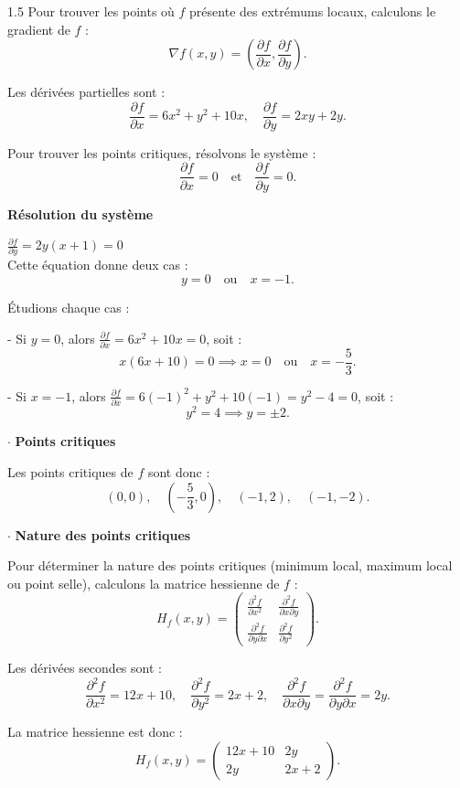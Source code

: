 \documentclass[12pt]{article}
\begin{document}
\begin{spacing}{1.5}
Pour trouver les points où $f$ présente des extrémums locaux, calculons le gradient de $f$ :
\[
\nabla f(x, y) = \left( \frac{\partial f}{\partial x}, \frac{\partial f}{\partial y} \right).
\]

Les dérivées partielles sont :
\[
\frac{\partial f}{\partial x} = 6x^2 + y^2 + 10x, \quad \frac{\partial f}{\partial y} = 2xy + 2y.
\]

Pour trouver les points critiques, résolvons le système :
\[
\frac{\partial f}{\partial x} = 0 \quad \text{et} \quad \frac{\partial f}{\partial y} = 0.
\]

\textbf{ Résolution du système}

 $\frac{\partial f}{\partial y} = 2y(x + 1) = 0$ \\
   Cette équation donne deux cas :
\[
   y = 0 \quad \text{ou} \quad x = -1.
\]

 Étudions chaque cas :

   - Si $y = 0$, alors $\frac{\partial f}{\partial x} = 6x^2 + 10x = 0$, soit :
\[
     x(6x + 10) = 0 \implies x = 0 \quad \text{ou} \quad x = -\frac{5}{3}.
\]

   - Si $x = -1$, alors $\frac{\partial f}{\partial x} = 6(-1)^2 + y^2 + 10(-1) = y^2 - 4 = 0$, soit :
\[
     y^2 = 4 \implies y = \pm 2.
\]

$\cdot$ \textbf{Points critiques}

Les points critiques de $f$ sont donc :
\[
(0, 0), \quad \left(-\frac{5}{3}, 0\right), \quad (-1, 2), \quad (-1, -2).
\]

$\cdot$ \textbf{ Nature des points critiques}

Pour déterminer la nature des points critiques (minimum local, maximum local ou point selle), calculons la matrice hessienne de $f$ :
\[
H_f(x, y) = 
\begin{pmatrix}
\frac{\partial^2 f}{\partial x^2} & \frac{\partial^2 f}{\partial x \partial y} \\
\frac{\partial^2 f}{\partial y \partial x} & \frac{\partial^2 f}{\partial y^2}
\end{pmatrix}.
\]

Les dérivées secondes sont :
\[
\frac{\partial^2 f}{\partial x^2} = 12x + 10, \quad 
\frac{\partial^2 f}{\partial y^2} = 2x + 2, \quad 
\frac{\partial^2 f}{\partial x \partial y} = \frac{\partial^2 f}{\partial y \partial x} = 2y.
\]

La matrice hessienne est donc :
\[
H_f(x, y) = 
\begin{pmatrix}
12x + 10 & 2y \\
2y & 2x + 2
\end{pmatrix}.
\]


\end{spacing}
\end{document}

